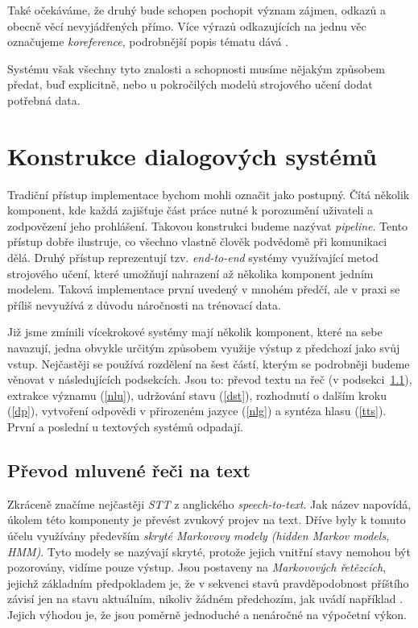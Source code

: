 Také očekáváme, že druhý bude schopen pochopit význam zájmen, odkazů
a obecně věcí nevyjádřených přímo. Více výrazů odkazujících na jednu věc
označujeme \textit{koreference}, podrobnější popis tématu dává
\citet[kapitola 21]{jurafsky_slp_2020}.

Systému však všechny tyto znalosti a schopnosti musíme nějakým způsobem předat, buď
explicitně, nebo u pokročilých modelů strojového učení dodat potřebná
data.


\section{Konstrukce dialogových systémů}

Tradiční přístup implementace bychom mohli označit jako postupný. Čítá několik
komponent, kde každá zajišťuje část práce nutné k porozumění uživateli a
zodpovězení jeho prohlášení. Takovou konstrukci budeme nazývat \textit{pipeline}.
Tento přístup dobře ilustruje, co všechno vlastně
člověk podvědomě při komunikaci dělá. Druhý přístup reprezentují tzv. \textit{end-to-end}
systémy využívající metod strojového učení, které umožňují nahrazení až
několika komponent jedním modelem. Taková implementace první uvedený v mnohém
předčí, ale v praxi se příliš nevyužívá z důvodu náročnosti na trénovací data.

Již jsme zmínili vícekrokové systémy mají několik komponent, které na sebe
navazují, jedna obvykle určitým způsobem využije výstup z předchozí jako svůj
vstup. Nejčastěji se používá rozdělení na šest částí, kterým se podrobněji
budeme věnovat v následujících podsekcích. Jsou to: převod textu na řeč (v podsekci~\ref{stt}),
extrakce významu (\ref{nlu}), udržování stavu (\ref{dst}), rozhodnutí o dalším kroku (\ref{dp}),
vytvoření odpovědi v přirozeném jazyce (\ref{nlg}) a syntéza hlasu (\ref{tts}). První
a poslední u textových systémů odpadají.

\subsection{Převod mluvené řeči na text}\label{stt}

Zkráceně značíme nejčastěji \textit{STT} z anglického \textit{speech-to-text}.
Jak název napovídá, úkolem této komponenty je převést zvukový projev na text.
Dříve byly k tomuto účelu využívány především \textit{skryté
    Markovovy modely (hidden Markov models, HMM)}. Tyto modely se nazývají skryté,
protože jejich vnitřní stavy nemohou být pozorovány, vidíme pouze výstup.
Jsou postaveny na \textit{Markovových řetězcích}, jejichž základním předpokladem
je, že v sekvenci stavů pravděpodobnost příštího závisí jen na stavu aktuálním,
nikoliv žádném předchozím, jak uvádí například \citet[strana 4]{brooks_handbook_2011}.
Jejich výhodou je, že jsou poměrně jednoduché a nenáročné na výpočetní výkon.

